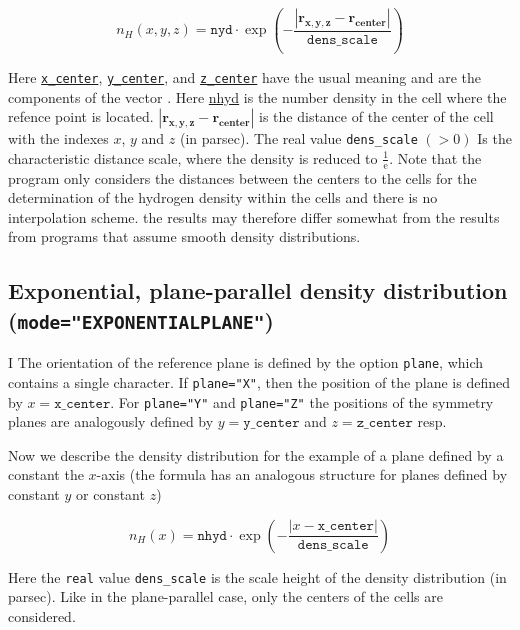 \documentclass[a4paper,10pt]{article}
\begin{document}
\begin{appendix}
\begin{equation}
 n_H(x,y,z) = \mathtt{nyd} \cdot \exp\left(- \frac{\left|\mathbf{r_{x,y,z}} - 
\mathbf{r_{center}} \right|}{\mathtt{dens\_scale}}\right)
\end{equation}

Here \hyperref[hydoptnl:xcenter]{\texttt{x\_center}}, 
\hyperref[hydopt:ycenter]{\texttt{y\_center}}, 
and \hyperref[hydopt:zcenter]{\texttt{z\_center}} have the 
usual meaning and are the components of the vector $\mathbf{}$. 
Here \hyperref[hydopt:nhyd]{nhyd} is the number density in the cell where the 
refence point is located. 
$\left|\mathbf{r_{x,y,z}} - \mathbf{r_{center}} \right|$ is the
distance of the center of the cell with the indexes $x$, $y$ and $z$ (in 
parsec). The real value \texttt{dens\_scale} $(>0)$ Is the characteristic 
distance scale, where the density is reduced to $\frac{1}{\mathrm{e}}$.
Note that the program only considers the distances between the centers to the 
cells for the determination of the hydrogen density within the cells and there 
is no interpolation scheme. the results may therefore differ somewhat from the 
results from programs that assume smooth density distributions.

\subsection{Exponential, plane-parallel  density distribution\\
(\texttt{mode="EXPONENTIALPLANE"})}
I
The orientation of the reference plane is defined by the option \texttt{plane}, 
which contains a single character. If \texttt{plane="X"}, then the 
position of the plane is defined by $x=\mathtt{x\_center}$. For 
\texttt{plane="Y"} and 
\texttt{plane="Z"} the positions of the symmetry planes are analogously 
defined by  $y=\mathtt{y\_center}$  and  $z=\mathtt{z\_center}$ resp.

Now we describe the density distribution for the example of a plane defined by 
a constant the $x$-axis (the formula has an analogous structure for planes 
defined by constant $y$ or constant $z$)

\begin{equation}
n_H(x) = \mathtt{nhyd} \cdot \exp\left(- 
\frac{\left|x - \mathtt{x\_center} \right|}{\mathtt{dens\_scale}}\right)
\end{equation}

Here the \texttt{real} value \texttt{dens\_scale} is the scale height of the 
density distribution (in parsec).
Like in the plane-parallel case, only the centers of the cells are considered.


\end{appendix}
\end{document}
